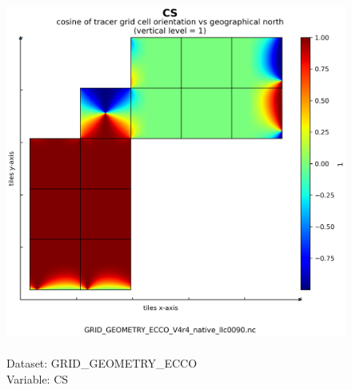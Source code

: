\begin{figure}[H]
\centering
\includegraphics[scale=0.5]{../images/plots/native_plots_coords/Geometry_Parameters_for_the_Lat-Lon-Cap_90_(llc90)_Native_Model_Grid_(Version_4_Release_4)/CS.png}
\caption{\\Dataset: GRID\_GEOMETRY\_ECCO\\Variable: CS}
\label{tab:table-GRID_GEOMETRY_ECCO_CS-Plot}
\end{figure}
\pagebreak
